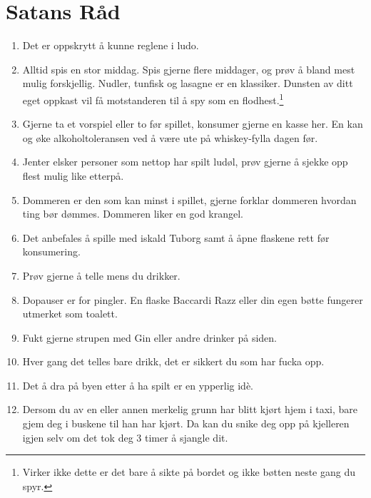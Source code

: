 \documentclass[10pt,a4paper,norsk,openany]{book}
\begin{document}
\section{Satans Råd}

\begin{enumerate}
	\item Det er oppskrytt å kunne reglene i ludo.
    
	\item Alltid spis en stor middag. Spis gjerne flere middager, og prøv å bland
    mest mulig forskjellig. Nudler, tunfisk og lasagne er en klassiker. Dunsten av
    ditt eget oppkast vil få motstanderen til å spy som en
    flodhest.$\!$\footnote{Virker ikke dette er det bare å sikte på bordet og ikke
    bøtten neste gang du spyr.}
    
  \item Gjerne ta et vorspiel eller to før spillet, konsumer gjerne en kasse
    her. En kan og øke alkoholtoleransen ved å være ute på whiskey-fylla dagen før.
    
  \item Jenter elsker personer som nettop har spilt ludøl, prøv gjerne å
    sjekke opp flest mulig like etterpå.
    
  \item Dommeren er den som kan minst i spillet, gjerne forklar dommeren
    hvordan ting bør dømmes. Dommeren liker en god krangel.
    
  \item Det anbefales å spille med iskald Tuborg samt å åpne flaskene rett før
    konsumering.
    
  \item Prøv gjerne å telle mens du drikker. 
    
  \item Dopauser er for pingler. En flaske Baccardi Razz eller din egen bøtte
    fungerer utmerket som toalett.
    
  \item Fukt gjerne strupen med Gin eller andre drinker på siden.
    
  \item Hver gang det telles bare drikk, det er sikkert du som har fucka opp.

  \item Det å dra på byen etter å ha spilt er en ypperlig idè.

  \item Dersom du av en eller annen merkelig grunn har blitt kjørt hjem i taxi,
    bare gjem deg i buskene til han har kjørt. Da kan du snike deg opp på
    kjelleren igjen selv om det tok deg 3 timer å sjangle dit.
\end{enumerate}
\end{document}
